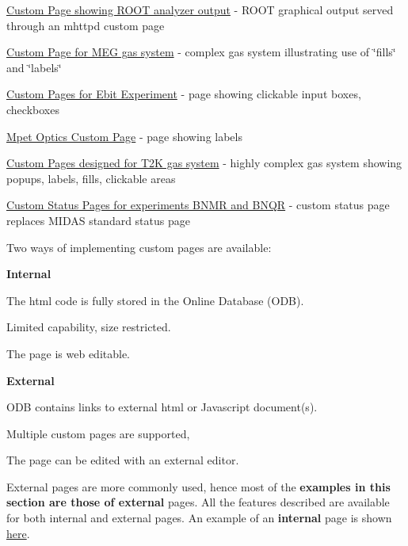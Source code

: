\begin{DoxyItemize}
\item \hyperlink{RC_ROOT_analyzer_page}{Custom Page showing ROOT analyzer output} -\/ ROOT graphical output served through an mhttpd custom page
\item \hyperlink{RC_MEG_Gas_Page}{Custom Page for MEG gas system} -\/ complex gas system illustrating use of \char`\"{}fills\char`\"{} and \char`\"{}labels\char`\"{}
\item \hyperlink{RC_Ebit_custom_page}{Custom Pages for Ebit Experiment} -\/ page showing clickable input boxes, checkboxes
\item \hyperlink{RC_Mpet_custom_page}{Mpet Optics Custom Page} -\/ page showing labels
\item \hyperlink{RC_T2K_Gas_Page}{Custom Pages designed for T2K gas system} -\/ highly complex gas system showing popups, labels, fills, clickable areas
\item \hyperlink{RC_BNMQR_status}{Custom Status Pages for experiments BNMR and BNQR} -\/ custom status page replaces MIDAS standard status page \label{index_end}
\hypertarget{index_end}{}

\end{DoxyItemize}

\par


Two ways of implementing custom pages are available: 
\begin{DoxyEnumerate}
\item {\bfseries Internal} 
\begin{DoxyItemize}
\item The html code is fully stored in the Online Database (ODB). 
\item Limited capability, size restricted. 
\item The page is web editable. 
\end{DoxyItemize}
\item {\bfseries External} 
\begin{DoxyItemize}
\item ODB contains links to external html or Javascript document(s). 
\item Multiple custom pages are supported, 
\item The page can be edited with an external editor. 
\end{DoxyItemize}
\end{DoxyEnumerate}\par
 External pages are more commonly used, hence most of the {\bfseries examples in this section are those of external} pages. All the features described are available for both internal and external pages. An example of an {\bfseries internal} page is shown \hyperlink{RC_mhttpd_Internal}{here}.


